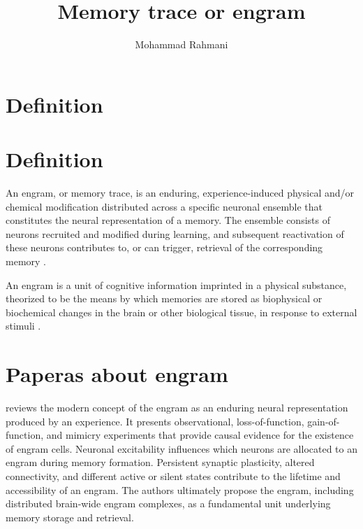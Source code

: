 \documentclass[a4paper]{article}
\title{Memory trace or engram}
\date{}
\author{Mohammad Rahmani}
\begin{document}
   \maketitle

   \section{Definition}
      \section{Definition}
      An engram, or memory trace, is an enduring, experience-induced physical and/or chemical modification distributed across a specific neuronal ensemble that constitutes the neural representation of a memory.
      The ensemble consists of neurons recruited and modified during learning, and subsequent reactivation of these neurons contributes to, or can trigger, retrieval of the corresponding memory \cite{josselyn-2020-memory-engrams-recalling-the-past-and-imagining-the-future,sakaguchi-2012-catching-the-engram-strategies-to-examine-the-memory-trace}.

      An engram is a unit of cognitive information imprinted in a physical substance, theorized to be the means by which memories are stored as biophysical or biochemical changes in the brain or other biological tissue, in response to external stimuli .

      \section{Paperas about engram}
      \cite{josselyn-2020-memory-engrams-recalling-the-past-and-imagining-the-future} reviews the modern concept of the engram as an enduring neural representation produced by an experience. It presents observational, loss-of-function, gain-of-function, and mimicry experiments that provide causal evidence for the existence of engram cells. Neuronal excitability influences which neurons are allocated to an engram during memory formation. Persistent synaptic plasticity, altered connectivity, and different active or silent states contribute to the lifetime and accessibility of an engram. The authors ultimately propose the engram, including distributed brain-wide engram complexes, as a fundamental unit underlying memory storage and retrieval.
\end{document}
